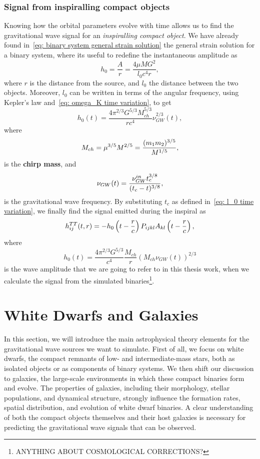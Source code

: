 \subsubsection{Signal from inspiralling compact objects}
Knowing how the orbital parameters evolve with time allows us to find the gravitational wave signal for an \textit{inspiralling compact object}.
We have already found in~\eqref{eq: binary system general strain solution} the general strain solution for a binary system, where its useful to redefine the instantaneous amplitude as
\[
    h_0 = \frac{A}{r} = \frac{4\mu M G^2}{l_0c^4r},
\]
where $r$ is the distance from the source, and $l_0$ the distance between the two objects.
Moreover, $l_0$ can be written in terms of the angular frequency, using Kepler's law and~\eqref{eq: omega_K time variation}, to get
\[
    h_0(t)=\frac{4\pi^{2/3}G^{5/3}M_{ch}^{5/3}}{rc^4}\nu_{GW}^{2/3}(t),
\]
where
\begin{equation}
    M_{ch} = \mu^{3/5}M^{2/5} = \frac{(m_1m_2)^{3/5}}{M^{1/5}},
    \notag
\end{equation}
is the \textbf{chirp mass}, and 
\begin{equation}
    \nu_{GW}(t)=\frac{\nu_{GW}^{in}t_c^{3/8}}{(t_c-t)^{3/8}},
    \notag
\end{equation}
is the gravitational wave frequency.
By substituting $t_c$ as defined in~\eqref{eq: l_0 time variation}, we finally find the signal emitted during the inspiral as
\begin{equation}
    h_{ij}^{TT}(t,r)= -h_0\left(t-\frac{r}{c}\right)P_{ijkl}A_{kl}\left(t-\frac{r}{c}\right),
    \notag
\end{equation}
where
\begin{equation}
    \boxed{h_0(t)= \frac{4\pi^{2/3}G^{5/3}}{c^4}\frac{M_{ch}}{r}(M_{ch}\nu_{GW}(t))^{2/3}}
    \label{eq: the strain we use}
\end{equation}
is the wave amplitude that we are going to refer to in this thesis work, when we calculate the signal from the simulated binaries\footnote{ANYTHING ABOUT COSMOLOGICAL CORRECTIONS?}.

\section{White Dwarfs and Galaxies}
In this section, we will introduce the main astrophysical theory elements for the gravitational wave sources we want to simulate.
First of all, we focus on white dwarfs, the compact remnants of low- and intermediate-mass stars, both as isolated objects or as components of binary systems.  
We then shift our discussion to galaxies, the large-scale environments in which these compact binaries form and evolve. 
The properties of galaxies, including their morphology, stellar populations, and dynamical structure, strongly influence the formation rates, spatial distribution, and evolution of white dwarf binaries. 
A clear understanding of both the compact objects themselves and their host galaxies is necessary for predicting the gravitational wave signals that can be observed.

